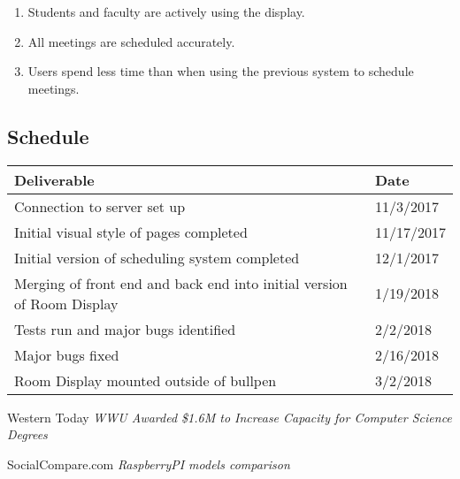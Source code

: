 \documentclass[12pt]{article}
\begin{document}
\begin{enumerate}
\item Students and faculty are actively using the display.
\item All meetings are scheduled accurately.
\item Users spend less time than when using the previous system to schedule meetings.
\end{enumerate}

\subsection{Schedule}
\begin{tabular}{|p{7.5cm}|p{7.5cm}|}
\hline
\textbf{Deliverable} & \textbf{Date} \\
\hline
Connection to server set up & 11/3/2017 \\
\hline
Initial visual style of pages completed & 11/17/2017 \\
\hline
Initial version of scheduling system completed & 12/1/2017 \\
\hline 
Merging of front end and back end into initial version of Room Display & 1/19/2018 \\
\hline
Tests run and major bugs identified & 2/2/2018 \\ 
\hline
Major bugs fixed & 2/16/2018 \\
\hline
Room Display mounted outside of bullpen & 3/2/2018 \\
\hline
\end{tabular}

\begin{thebibliography}{99}
Western Today 
\textit{WWU Awarded \$1.6M to Increase Capacity for Computer Science Degrees}

SocialCompare.com 
\textit{RaspberryPI models comparison}
\end{thebibliography}
\end{document}
